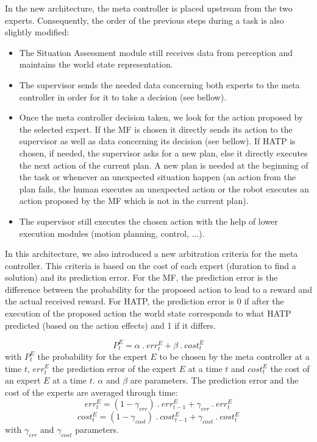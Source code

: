 \documentclass[english,a4paper,11pt,twoside]{StyleThese}
\begin{document}
In the new architecture, the meta controller is placed upstream from the two experts. Consequently, the order of the previous steps during a task is also slightly modified:
\begin{itemize}
\item The Situation Assessment module still receives data from perception and maintains the world state representation. 
\item The supervisor sends the needed data concerning both experts to the meta controller in order for it to take a decision (see bellow). 
\item Once the meta controller decision taken, we look for the action proposed by the selected expert. If the MF is chosen it directly sends its action to the supervisor as well as data concerning its decision (see bellow). If HATP is chosen, if needed, the supervisor asks for a new plan, else it directly executes the next action of the current plan. A new plan is needed at the beginning of the task or whenever an unexpected situation happen (an action from the plan fails, the human executes an unexpected action or the robot executes an action proposed by the MF which is not in the current plan).
\item The supervisor still executes the chosen action with the help of lower execution modules (motion planning, control, ...). 
\end{itemize}

In this architecture, we also introduced a new arbitration criteria for the meta controller. This criteria is based on the cost of each expert (duration to find a solution) and its prediction error. For the MF, the prediction error is the difference between the probability for the proposed action to lead to a reward and the actual received reward. For HATP, the prediction error is 0 if after the execution of the proposed action the world state corresponds to what HATP predicted (based on the action effects) and 1 if it differs.

$$P^E_t = \alpha \ . \ err^E_t + \beta \ . \ cost^E_t$$
with $P^E_t$ the probability for the expert $E$ to be chosen by the meta controller at a time $t$, $err^E_t$ the prediction error of the expert $E$ at a time $t$ and $cost^E_t$ the cost of an expert $E$ at a time $t$. $\alpha$ and $\beta$ are parameters. The prediction error and the cost of the experts are averaged through time:
$$err^E_t = (1- \gamma_{err}) \ . \ err^E_{t-1} + \gamma_{err} \ . \ err^E_t$$
$$cost^E_t = (1- \gamma_{cost}) \ . \ cost^E_{t-1} + \gamma_{cost} \ . \ cost^E_t$$
with $\gamma_{err}$ and $\gamma_{cost}$ parameters.
\end{document}
